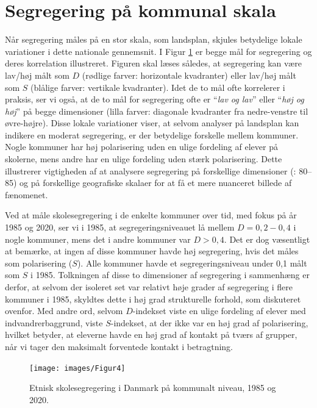 \documentclass[
]{book}
\begin{document}
\section{Segregering på kommunal skala}\label{segregering-puxe5-kommunal-skala}

Når segregering måles på en stor skala, som landsplan, skjules betydelige lokale variationer i dette nationale gennemsnit. I Figur \ref{fig:fig-4-3} er begge mål for segregering og deres korrelation illustreret. Figuren skal læses således, at segregering kan være lav/høj målt som \(D\) (rødlige farver: horizontale kvadranter) eller lav/høj målt som \(S\) (blålige farver: vertikale kvadranter). Idet de to mål ofte korrelerer i praksis, ser vi også, at de to mål for segregering ofte er ``\emph{lav og lav}'' eller ``\emph{høj og høj}'' på begge dimensioner (lilla farver: diagonale kvadranter fra nedre-venstre til øvre-højre). Disse lokale variationer viser, at selvom analyser på landsplan kan indikere en moderat segregering, er der betydelige forskelle mellem kommuner. Nogle kommuner har høj polarisering uden en ulige fordeling af elever på skolerne, mens andre har en ulige fordeling uden stærk polarisering. Dette illustrerer vigtigheden af at analysere segregering på forskellige dimensioner (: 80--85) og på forskellige geografiske skalaer for at få et mere nuanceret billede af fænomenet.

Ved at måle skolesegregering i de enkelte kommuner over tid, med fokus på år 1985 og 2020, ser vi i 1985, at segregeringsniveauet lå mellem \(D=0,2-0,4\) i nogle kommuner, mens det i andre kommuner var \(D>0,4\). Det er dog væsentligt at bemærke, at ingen af disse kommuner havde høj segregering, hvis det måles som polarisering (\(S\)). Alle kommuner havde et segregeringsniveau under 0,1 målt som \(S\) i 1985. Tolkningen af disse to dimensioner af segregering i sammenhæng er derfor, at selvom der isoleret set var relativt høje grader af segregering i flere kommuner i 1985, skyldtes dette i høj grad strukturelle forhold, som diskuteret ovenfor. Med andre ord, selvom \(D\)-indekset viste en ulige fordeling af elever med indvandrerbaggrund, viste \(S\)-indekset, at der ikke var en høj grad af polarisering, hvilket betyder, at eleverne havde en høj grad af kontakt på tværs af grupper, når vi tager den maksimalt forventede kontakt i betragtning.

\begin{figure}
\texttt{[image: images/Figur4]} \caption{Etnisk skolesegregering i Danmark på kommunalt niveau, 1985 og 2020.}\label{fig:fig-4-3}
\end{figure}
\end{document}
